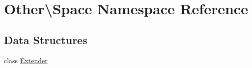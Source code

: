 \hypertarget{namespace_other_1_1_space}{}\section{Other\textbackslash{}Space Namespace Reference}
\label{namespace_other_1_1_space}
\subsection*{Data Structures}
\begin{DoxyCompactItemize}
\item 
class \mbox{\hyperlink{class_other_1_1_space_1_1_extender}{Extender}}
\end{DoxyCompactItemize}

